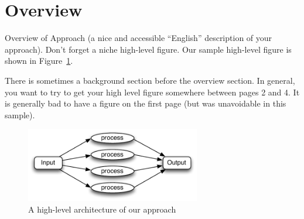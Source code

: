 \section{Overview}
\label{sec:overview}

Overview of Approach (a nice and accessible ``English'' description of
your approach). Don't forget a niche high-level figure. Our sample
high-level figure is shown in Figure~\ref{fig:overview}.

There is sometimes a background section before the overview section. In
general, you want to try to get your high level figure somewhere between
pages 2 and 4. It is generally bad to have a figure on the first page
(but was unavoidable in this sample).

\begin{figure}[t]
  \centering
  \includegraphics[width=3in]{figs/overview}
  \caption{A high-level architecture of our approach}
  \label{fig:overview}
\end{figure}
